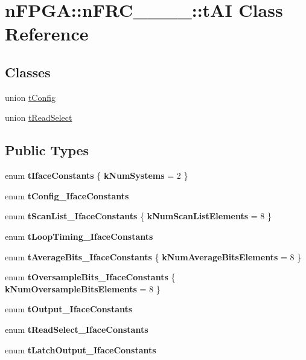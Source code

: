 \hypertarget{classnFPGA_1_1nFRC__2012__1__6__4_1_1tAI}{
\section{nFPGA::nFRC\_\_\_\_::tAI Class Reference}
\label{classnFPGA_1_1nFRC__2012__1__6__4_1_1tAI}
}
\subsection*{Classes}
\begin{DoxyCompactItemize}
\item 
union \hyperlink{unionnFPGA_1_1nFRC__2012__1__6__4_1_1tAI_1_1tConfig}{tConfig}
\item 
union \hyperlink{unionnFPGA_1_1nFRC__2012__1__6__4_1_1tAI_1_1tReadSelect}{tReadSelect}
\end{DoxyCompactItemize}
\subsection*{Public Types}
\begin{DoxyCompactItemize}
\item 
enum {\bfseries tIfaceConstants} \{ {\bfseries kNumSystems} =  2
 \}
\item 
enum {\bfseries tConfig\_\-IfaceConstants} 
\item 
enum {\bfseries tScanList\_\-IfaceConstants} \{ {\bfseries kNumScanListElements} =  8
 \}
\item 
enum {\bfseries tLoopTiming\_\-IfaceConstants} 
\item 
enum {\bfseries tAverageBits\_\-IfaceConstants} \{ {\bfseries kNumAverageBitsElements} =  8
 \}
\item 
enum {\bfseries tOversampleBits\_\-IfaceConstants} \{ {\bfseries kNumOversampleBitsElements} =  8
 \}
\item 
enum {\bfseries tOutput\_\-IfaceConstants} 
\item 
enum {\bfseries tReadSelect\_\-IfaceConstants} 
\item 
enum {\bfseries tLatchOutput\_\-IfaceConstants} 
\end{DoxyCompactItemize}

